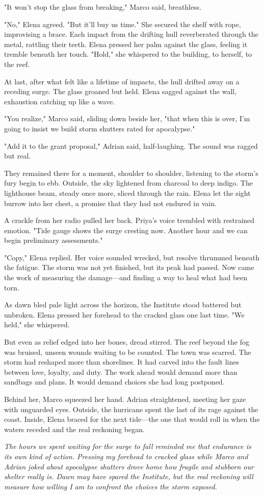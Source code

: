 "It won't stop the glass from breaking," Marco said, breathless.

"No," Elena agreed. "But it'll buy us time." She secured the shelf with rope, improvising a brace. Each impact from the drifting hull reverberated through the metal, rattling their teeth. Elena pressed her palm against the glass, feeling it tremble beneath her touch. "Hold," she whispered to the building, to herself, to the reef.

At last, after what felt like a lifetime of impacts, the hull drifted away on a receding surge. The glass groaned but held. Elena sagged against the wall, exhaustion catching up like a wave.

"You realize," Marco said, sliding down beside her, "that when this is over, I'm going to insist we build storm shutters rated for apocalypse."

"Add it to the grant proposal," Adrian said, half-laughing. The sound was ragged but real.

They remained there for a moment, shoulder to shoulder, listening to the storm's fury begin to ebb. Outside, the sky lightened from charcoal to deep indigo. The lighthouse beam, steady once more, sliced through the rain. Elena let the sight burrow into her chest, a promise that they had not endured in vain.

A crackle from her radio pulled her back. Priya's voice trembled with restrained emotion. "Tide gauge shows the surge cresting now. Another hour and we can begin preliminary assessments."

"Copy," Elena replied. Her voice sounded wrecked, but resolve thrummed beneath the fatigue. The storm was not yet finished, but its peak had passed. Now came the work of measuring the damage—and finding a way to heal what had been torn.

As dawn bled pale light across the horizon, the Institute stood battered but unbroken. Elena pressed her forehead to the cracked glass one last time. "We held," she whispered.

But even as relief edged into her bones, dread stirred. The reef beyond the fog was bruised, unseen wounds waiting to be counted. The town was scarred. The storm had reshaped more than shorelines. It had carved into the fault lines between love, loyalty, and duty. The work ahead would demand more than sandbags and plans. It would demand choices she had long postponed.

Behind her, Marco squeezed her hand. Adrian straightened, meeting her gaze with unguarded eyes. Outside, the hurricane spent the last of its rage against the coast. Inside, Elena braced for the next tide—the one that would roll in when the waters receded and the real reckoning began.

\noindent\textit{The hours we spent waiting for the surge to fall reminded me that endurance is its own kind of action. Pressing my forehead to cracked glass while Marco and Adrian joked about apocalypse shutters drove home how fragile and stubborn our shelter really is. Dawn may have spared the Institute, but the real reckoning will measure how willing I am to confront the choices the storm exposed.}
